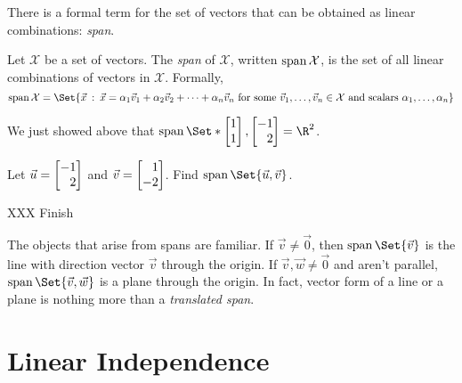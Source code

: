 There is a formal term for the set of vectors that can be obtained as linear combinations: \emph{span}.

\begin{definition}[Span]
	Let $\mathcal X$ be a set of vectors. The \emph{span} of $\mathcal X$, written $\operatorname{span} \mathcal X$,
	is the set of all linear combinations of vectors in $\mathcal X$. Formally,
	\[
	\Span \mathcal X = \Set{\vec x\given \vec x = \alpha_1\vec v_1+\alpha_2\vec v_2+
	\cdots+\alpha_n\vec v_n\text{ for some }\vec v_1,\ldots,\vec v_n\in\mathcal X
	\text{ and scalars }\alpha_1,\ldots,\alpha_n}
	\]
\end{definition}

We just showed above that $\Span\Set*{\mat{1\\1},\mat{-1\\2}}=\R^2$.

\begin{example}
	Let $\vec u=\mat{-1\\2}$ and $\vec v=\mat{1\\-2}$. Find $\Span\Set{\vec u,\vec v}$.

	XXX Finish
\end{example}

The objects that arise from spans are familiar. If $\vec v\neq\vec 0$, then $\Span\Set{\vec v}$
is the line with direction vector $\vec v$ through the origin. If $\vec v,\vec w\neq \vec 0$ and
aren't parallel, $\Span\Set{\vec v,\vec w}$ is a plane through the origin. In fact, vector form of
a line or a plane is nothing more than a \emph{translated span}.

\section{Linear Independence}

